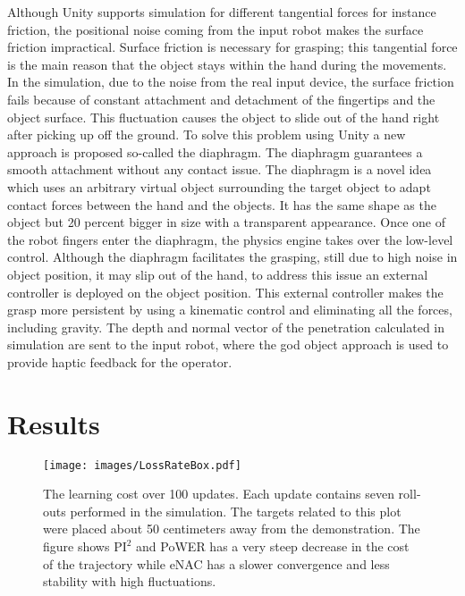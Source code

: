 \documentclass[letterpaper, 10 pt, conference]{ieeeconf}  %
\begin{document}
\noindent
Although Unity supports simulation for different tangential forces for instance friction, the positional noise coming from the input robot makes the surface friction impractical. Surface friction is necessary for grasping; this tangential force is the main reason that the object stays within the hand during the movements. In the simulation, due to the noise from the real input device, the surface friction fails because of constant attachment and detachment of the fingertips and the object surface.
This fluctuation causes the object to slide out of the hand right after picking up off the ground. To solve this problem using Unity a new approach is proposed so-called the diaphragm. The diaphragm guarantees a smooth attachment without any contact issue.
The diaphragm is a novel idea which uses an arbitrary virtual object surrounding the target object to adapt contact forces between the hand and the objects. It has the same shape as the object but 20 percent bigger in size with a transparent appearance. Once one of the robot fingers enter the diaphragm, the physics engine takes over the low-level control. Although the diaphragm facilitates the grasping, still due to high noise in object position, it may slip out of the hand, to address this issue an external controller is deployed on the object position. This external controller makes the grasp more persistent by using a kinematic control and eliminating all the forces, including gravity. The depth and normal vector of the penetration calculated in simulation are sent to the input robot, where the god object approach \cite{godobjects1} is used to provide haptic feedback for the operator.

\section{Results}
\label{section:results}
\begin{figure}[t]
    \centering
    \texttt{[image: images/LossRateBox.pdf]}
    \caption[The learning cost over 100 updates.]{The learning cost over 100 updates. Each update contains seven roll-outs performed in the simulation. The targets related to this plot were placed about 50 centimeters away from the demonstration. The figure shows $\textrm{PI}^2$ and PoWER has a very steep decrease in the cost of the trajectory while eNAC has a slower convergence and less stability with high fluctuations.}
    \label{fig:LossRateBox}
    \vspace{-3mm}
\end{figure}
\end{document}
